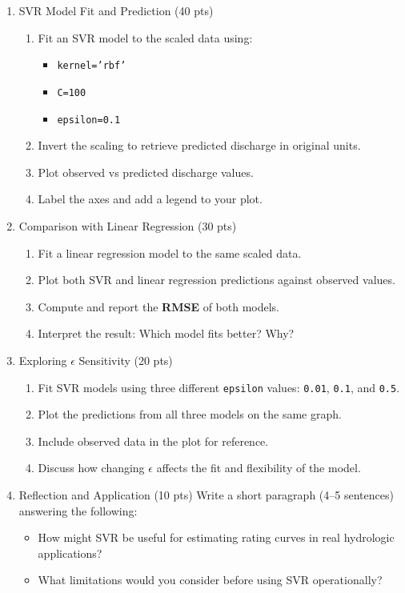 \documentclass[12pt]{article}
\begin{document}
\begin{enumerate}

\item SVR Model Fit and Prediction (40 pts)
\begin{enumerate}
    \item Fit an SVR model to the scaled data using:
    \begin{itemize}
        \item \texttt{kernel='rbf'}
        \item \texttt{C=100}
        \item \texttt{epsilon=0.1}
    \end{itemize}
    \item Invert the scaling to retrieve predicted discharge in original units.
    \item Plot observed vs predicted discharge values.
    \item Label the axes and add a legend to your plot.
\end{enumerate}

\item Comparison with Linear Regression (30 pts)
\begin{enumerate}
    \item Fit a linear regression model to the same scaled data.
    \item Plot both SVR and linear regression predictions against observed values.
    \item Compute and report the \textbf{RMSE} of both models.
    \item Interpret the result: Which model fits better? Why?
\end{enumerate}

\item Exploring $\epsilon$ Sensitivity (20 pts)
\begin{enumerate}
    \item Fit SVR models using three different \texttt{epsilon} values: \texttt{0.01}, \texttt{0.1}, and \texttt{0.5}.
    \item Plot the predictions from all three models on the same graph.
    \item Include observed data in the plot for reference.
    \item Discuss how changing $\epsilon$ affects the fit and flexibility of the model.
\end{enumerate}

\item Reflection and Application (10 pts)
Write a short paragraph (4--5 sentences) answering the following:
\begin{itemize}
    \item How might SVR be useful for estimating rating curves in real hydrologic applications?
    \item What limitations would you consider before using SVR operationally?
\end{itemize}







\end{enumerate}
\end{document}
